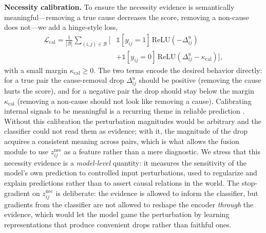 \documentclass[journal]{IEEEtran}
\begin{document}
\noindent\textbf{Necessity calibration.} To ensure the necessity evidence is semantically
meaningful---removing a true cause decreases the score, removing a non-cause does not---we
add a hinge-style loss,
\begin{align}
\mathcal{L}_{\mathrm{cal}}=\frac{1}{|\mathcal{B}|}\sum_{(i,j)\in\mathcal{B}}\Big[&\mathbb{1}[y_{ij}=1]\,\mathrm{ReLU}(-\Delta_{ij}^{u})\nonumber\\
&+\mathbb{1}[y_{ij}=0]\,\mathrm{ReLU}(\Delta_{ij}^{u}-\kappa_{\mathrm{cal}})\Big],
\end{align}
with a small margin $\kappa_{\mathrm{cal}}\ge 0$. The two terms encode the desired behavior
directly: for a true pair the cause-removal drop $\Delta_{ij}^{u}$ should be positive (removing
the cause hurts the score), and for a negative pair the drop should stay below the margin
$\kappa_{\mathrm{cal}}$ (removing a non-cause should not look like removing a cause). Calibrating internal
signals to be meaningful is a recurring theme in reliable prediction
\cite{guo2017calibration}. Without
this calibration the perturbation magnitudes would be arbitrary and the classifier could not
read them as evidence; with it, the magnitude of the drop acquires a consistent meaning across
pairs, which is what allows the fusion module to use $z_{ij}^{\mathrm{nec}}$ as a feature
rather than a mere diagnostic. We stress that this necessity evidence is
a \emph{model-level} quantity: it measures the sensitivity of the model's own prediction to
controlled input perturbations, used to regularize and explain predictions rather than to
assert causal relations in the world. The stop-gradient on $z_{ij}^{\mathrm{nec}}$ is
deliberate: the evidence is allowed to inform the classifier, but gradients from the classifier
are not allowed to reshape the encoder \emph{through} the evidence, which would let the model
game the perturbation by learning representations that produce convenient drops rather than
faithful ones.
\end{document}
